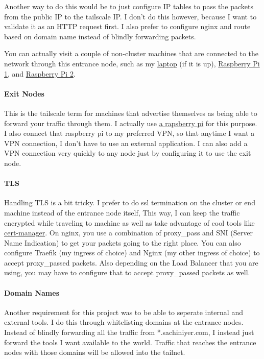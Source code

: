 \documentclass[12pt]{article}
\begin{document}
Another way to do this would be to just configure IP tables to pass the packets from the public IP to the tailscale IP. I don't do this however, because I want to validate it as an HTTP request first. I also prefer to configure nginx and route based on domain name instead of blindly forwarding packets.

You can actually visit a couple of non-cluster machines that are connected to the network through this entrance node, such as my \href{https://computer.sachiniyer.com}{laptop} (if it is up), \href{https://coffeesociety.sachiniyer.com}{Raspberry Pi 1}, and \href{https://playground.sachiniyer.com}{Raspberry Pi 2}.

\paragraph{Exit Nodes}
This is the tailscale term for machines that advertise themselves as being able to forward your traffic through them. I actually use \href{https://playground.sachiniyer.com}{a rapsberry pi} for this purpose. I also connect that raspberry pi to my preferred VPN, so that anytime I want a VPN connection, I don't have to use an external application. I can also add a VPN connection very quickly to any node just by configuring it to use the exit node.

\paragraph{TLS}
Handling TLS is a bit tricky. I prefer to do ssl termination on the cluster or end machine instead of the entrance node itself, This way, I can keep the traffic encrypted while traveling to machine as well as take advantage of cool tools like \href{https://cert-manager.io/}{cert-manager}. On nginx, you use a combination of proxy\_pass and SNI (Server Name Indication) to get your packets going to the right place. You can also configure Traefik (my ingress of choice) and Nginx (my other ingress of choice) to accept proxy\_passed packets. Also depending on the Load Balancer that you are using, you may have to configure that to accept proxy\_passed packets as well.

\paragraph{Domain Names}
Another requirement for this project was to be able to seperate internal and external tools. I do this through whitelisting domains at the entrance nodes. Instead of blindly forwarding all the traffic from *.sachiniyer.com, I instead just forward the tools I want available to the world. Traffic that reaches the entrance nodes with those domains will be allowed into the tailnet.
\end{document}
